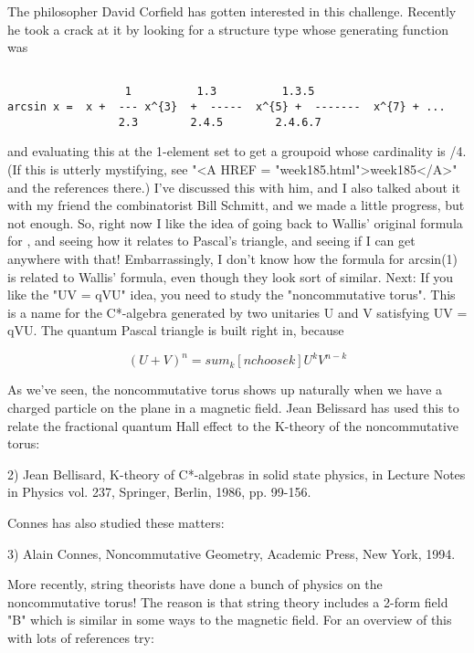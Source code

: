 The philosopher David Corfield has gotten interested in this challenge.
Recently he took a crack at it by looking for a structure type whose
generating function was 
 

\begin{verbatim}

                  1          1.3          1.3.5
arcsin x =  x +  --- x^{3}  +  -----  x^{5} +  -------  x^{7} + ...
                 2.3        2.4.5        2.4.6.7
\end{verbatim}
    
and evaluating this at the 1-element set to get a groupoid whose
cardinality is \pi /4.  (If this is utterly mystifying, see "<A HREF = "week185.html">week185</A>" 
and the references there.)  I've discussed this with him, and I also talked 
about it with my friend the combinatorist Bill Schmitt, and we made 
a little progress, but not enough.  So, right now I like the idea
of going back to Wallis' original formula for \pi , and seeing how
it relates to Pascal's triangle, and seeing if I can get anywhere
with that!  
Embarrassingly, I don't know how the formula for arcsin(1)
is related to Wallis' formula, even though they look sort of similar.
Next:
If you like the "UV = qVU" idea, you need to study the "noncommutative
torus".  This is a name for the C*-algebra generated by two unitaries U
and V satisfying UV = qVU.  The quantum Pascal triangle is built right
in, because


$$

(U + V)^{n} = sum_{k} [n choose k] U^{k} V^{n-k}
$$
    
As we've seen, the noncommutative torus shows up naturally when we have
a charged particle on the plane in a magnetic field.  Jean Belissard has
used this to relate the fractional quantum Hall effect to the K-theory
of the noncommutative torus:

2) Jean Bellisard, K-theory of C*-algebras in solid state physics, in
Lecture Notes in Physics vol. 237, Springer, Berlin, 1986, pp. 99-156.

Connes has also studied these matters:

3) Alain Connes, Noncommutative Geometry, Academic Press, New
York, 1994.  

More recently, string theorists have done a bunch of physics on the
noncommutative torus!  The reason is that string theory includes a
2-form field "B" which is similar in some ways to the magnetic field.
For an overview of this with lots of references try:


